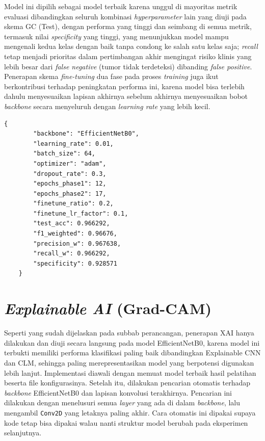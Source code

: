 Model ini dipilih sebagai model terbaik karena unggul di mayoritas metrik evaluasi dibandingkan seluruh kombinasi \textit{hyperparameter} lain yang diuji pada skema GC (Test), dengan performa yang tinggi dan seimbang di semua metrik, termasuk nilai \textit{specificity} yang tinggi, yang menunjukkan model mampu mengenali kedua kelas dengan baik tanpa condong ke salah satu kelas saja; \textit{recall} tetap menjadi prioritas dalam pertimbangan akhir mengingat risiko klinis yang lebih besar dari \textit{false negative} (tumor tidak terdeteksi) dibanding \textit{false positive}. Penerapan skema \textit{fine-tuning} dua fase pada proses \textit{training} juga ikut berkontribusi terhadap peningkatan performa ini, karena model bisa terlebih dahulu menyesuaikan lapisan akhirnya sebelum akhirnya menyesuaikan bobot \textit{backbone} secara menyeluruh dengan \textit{learning rate} yang lebih kecil.

\begin{lstlisting}[caption={Konfigurasi Hyperparameter dan Hasil Evaluasi Model Terbaik EfficientNetB0}, label={lst:hyperparam-effnet}, captionpos=t]
	{
		"backbone": "EfficientNetB0",
		"learning_rate": 0.01,
		"batch_size": 64,
		"optimizer": "adam",
		"dropout_rate": 0.3,
		"epochs_phase1": 12,
		"epochs_phase2": 17,
		"finetune_ratio": 0.2,
		"finetune_lr_factor": 0.1,
		"test_acc": 0.966292,
		"f1_weighted": 0.96676,
		"precision_w": 0.967638,
		"recall_w": 0.966292,
		"specificity": 0.928571
	}
\end{lstlisting}

\section{\textit{Explainable AI} (Grad-CAM)}

Seperti yang sudah dijelaskan pada subbab perancangan, penerapan XAI hanya dilakukan dan diuji secara langsung pada model EfficientNetB0, karena model ini terbukti memiliki performa klasifikasi paling baik dibandingkan Explainable CNN dan CLM, sehingga paling merepresentasikan model yang berpotensi digunakan lebih lanjut. Implementasi diawali dengan memuat model terbaik hasil pelatihan beserta file konfigurasinya. Setelah itu, dilakukan pencarian otomatis terhadap \textit{backbone} EfficientNetB0 dan lapisan konvolusi terakhirnya. Pencarian ini dilakukan dengan menelusuri semua \textit{layer} yang ada di dalam \textit{backbone}, lalu mengambil \texttt{Conv2D} yang letaknya paling akhir. Cara otomatis ini dipakai supaya kode tetap bisa dipakai walau nanti struktur model berubah pada eksperimen selanjutnya.

